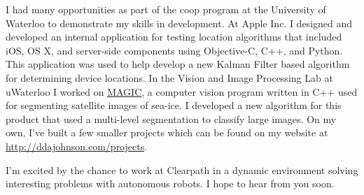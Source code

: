 \documentclass[11pt,a4paper,sans]{moderncv} %
\begin{document}
I had many opportunities as part of the coop program at the University of Waterloo to demonstrate my skills in development.  At Apple Inc. I designed and developed an internal application for testing location algorithms that included iOS, OS X, and server-side components using Objective-C, C++, and Python. This application was used to help develop a new Kalman Filter based algorithm for determining device locations. In the Vision and Image Processing Lab at uWaterloo I worked on \href{http://vip.uwaterloo.ca/demos/satellite-sar-sea-ice-classification}{MAGIC}, a computer vision program written in C++ used for segmenting satellite images of sea-ice. I developed a new algorithm for this product that used a multi-level segmentation to classify large images.  On my own, I've built a few smaller projects which can be found on my website at \url{http://ddajohnson.com/projects}.

I'm excited by the chance to work at Clearpath in a dynamic environment solving interesting problems with autonomous robots. I hope to hear from you soon.

\makeletterclosing %

\end{document}

